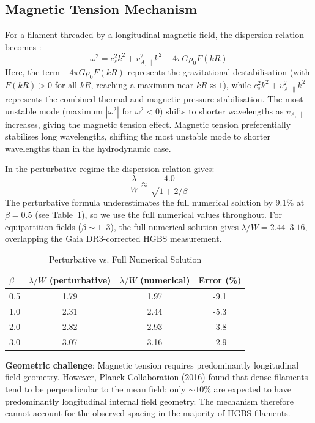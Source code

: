 \documentclass[twoside,twocolumn]{mnras}
\begin{document}
\subsection{Magnetic Tension Mechanism}

For a filament threaded by a longitudinal magnetic field, the dispersion relation
becomes \citep{Nakamura1993}:
\begin{equation}
\omega^2 = c_s^2 k^2 + v_{A,\parallel}^2 k^2 - 4\pi G\rho_0 F(kR)
\label{eq:dispersion}
\end{equation}
Here, the term $-4\pi G\rho_0 F(kR)$ represents the gravitational destabilisation (with $F(kR) > 0$ for all $kR$, reaching a maximum near $kR \approx 1$), while $c_s^2 k^2 + v_{A,\parallel}^2 k^2$ represents the combined thermal and magnetic pressure stabilisation. The most unstable mode (maximum $|\omega^2|$ for $\omega^2 < 0$) shifts to shorter wavelengths as $v_{A,\parallel}$ increases, giving the magnetic tension effect.
Magnetic tension preferentially stabilises long wavelengths, shifting the most unstable
mode to shorter wavelengths than in the hydrodynamic case.

In the perturbative regime the dispersion relation gives:
\begin{equation}
\frac{\lambda}{W} \approx \frac{4.0}{\sqrt{1 + 2/\beta}}
\label{eq:tension}
\end{equation}
The perturbative formula underestimates the full numerical solution by 9.1\% at $\beta=0.5$
(see Table~\ref{tab:perturbative}), so we use the full numerical values throughout.
For equipartition fields ($\beta \sim 1$--$3$), the full numerical solution gives
$\lambda/W = 2.44$--$3.16$, overlapping the Gaia DR3-corrected HGBS measurement.

\begin{table}
\caption{Perturbative vs. Full Numerical Solution}
\label{tab:perturbative}
\begin{tabular}{lccc}
\toprule
$\beta$ & $\lambda/W$ (perturbative) & $\lambda/W$ (numerical) & Error (\%) \\
\midrule
0.5 & 1.79 & 1.97 & -9.1 \\
1.0 & 2.31 & 2.44 & -5.3 \\
2.0 & 2.82 & 2.93 & -3.8 \\
3.0 & 3.07 & 3.16 & -2.9 \\
\bottomrule
\end{tabular}
\end{table}

\textbf{Geometric challenge}: Magnetic tension requires predominantly longitudinal field
geometry. However, Planck Collaboration (2016) found that dense filaments tend to be
perpendicular to the mean field; only ${\sim}10\%$ are expected to have predominantly
longitudinal internal field geometry. The mechanism therefore cannot account for the
observed spacing in the majority of HGBS filaments.
\end{document}
